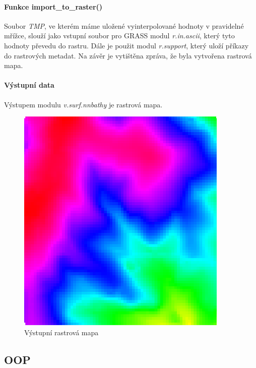 \documentclass[12pt,a4paper]{article}
\begin{document}
{\newpage
\paragraph{Funkce import\_to\_raster()}

Soubor \emph{TMP}, ve kterém máme uložené vyinterpolované hodnoty v
pravidelné mřížce, slouží jako vstupní soubor pro GRASS modul
\emph{r.in.ascii}, který tyto hodnoty převedu do rastru. Dále je
použit modul \emph{r.support}, který uloží příkazy do rastrových
metadat. Na závěr je vytištěna zpráva, že byla vytvořena rastrová
mapa.

\paragraph{Výstupní data}
Výstupem modulu \emph{v.surf.nnbathy} je rastrová mapa.

\begin{figure}[h!]
\centering
\includegraphics[width=0.9\textwidth]{img/vystup_rast_map.png}
\caption{Výstupní rastrová mapa}
\label{fig:vystup_rast_map}
\end{figure}

\newpage
\subsection{OOP}

}
\end{document}
